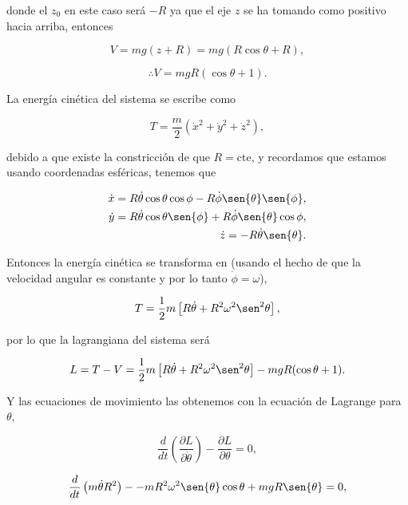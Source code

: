 \documentclass[a4paper,10pt]{article}
\numberwithin{equation}{section}
\begin{document}
donde el $z_0$ en este caso será $-R$ ya que el eje $z$ se ha tomando como positivo 
hacia arriba, entonces 

\begin{equation}
 V = mg(z + R) = mg(R\cos{\theta} + R),
\end{equation}

\begin{equation}
 \therefore V = mgR(\cos{\theta} + 1).
\end{equation}

La energía cinética del sistema se escribe como 

\begin{equation}
 T = \frac{m}{2}(\dot{x}^2 + \dot{y}^2 + \dot{z}^2),
\end{equation}

debido a que existe la constricción de que $R = \text{cte}$, y recordamos que 
estamos usando coordenadas esféricas, tenemos que 

\begin{align*}
 \dot{x} = R\dot{\theta}\cos{\theta}\cos{\phi} - R\dot{\phi}\sen{\theta}\sen{\phi}, \\
 \dot{y} = R\dot{\theta}\cos{\theta}\sen{\phi} + R\dot{\phi}\sen{\theta}\cos{\phi}, \\
 \dot{z} = - R\dot{\theta}\sen{\theta}.
\end{align*}

Entonces la energía cinética se transforma en (usando el hecho de que la velocidad 
angular es constante y por lo tanto $\dot{\phi} = \omega$),

\begin{equation}
 T = \frac{1}{2}m\left[R\dot{\theta} + R^2\omega^2\sen^2{\theta} \right],
\end{equation}

por lo que la lagrangiana del sistema será

\begin{equation}
 L = T - V = \frac{1}{2}m\left[R\dot{\theta} + R^2\omega^2\sen^2{\theta} \right] 
 -  mgR(\cos{\theta} + 1).
\end{equation}

Y las ecuaciones de movimiento las obtenemos con la ecuación de Lagrange para 
$\theta$, 

\begin{equation}
 \frac{d}{dt}\left(\frac{\partial L}{\partial \dot{\theta}}\right) - 
 \frac{\partial L}{\partial \theta} = 0,
\end{equation}

\begin{equation}
 \frac{d}{dt}\left( m\dot{\theta}R^2 \right) - 
 - mR^2\omega^2\sen{\theta}\cos{\theta} + mgR\sen{\theta}  = 0,
\end{equation}
\end{document}
